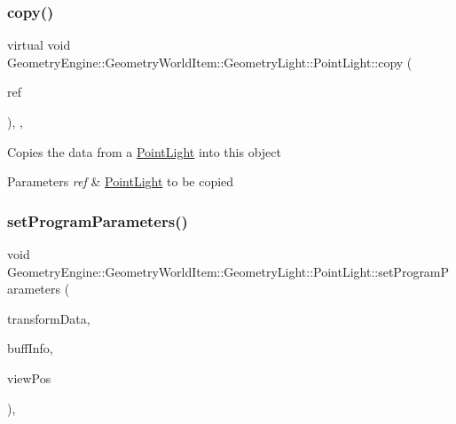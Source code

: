 \subsubsection{\texorpdfstring{copy()}{copy()}}
{\footnotesize\ttfamily virtual void Geometry\+Engine\+::\+Geometry\+World\+Item\+::\+Geometry\+Light\+::\+Point\+Light\+::copy (\begin{DoxyParamCaption}\item[{const \mbox{\hyperlink{class_geometry_engine_1_1_geometry_world_item_1_1_geometry_light_1_1_point_light}{Point\+Light}} \&}]{ref }\end{DoxyParamCaption})\hspace{0.3cm}{\ttfamily [inline]}, {\ttfamily [protected]}, {\ttfamily [virtual]}}

Copies the data from a \mbox{\hyperlink{class_geometry_engine_1_1_geometry_world_item_1_1_geometry_light_1_1_point_light}{Point\+Light}} into this object 
\begin{DoxyParams}{Parameters}
{\em ref} & \mbox{\hyperlink{class_geometry_engine_1_1_geometry_world_item_1_1_geometry_light_1_1_point_light}{Point\+Light}} to be copied \\
\hline
\end{DoxyParams}
\mbox{\label{class_geometry_engine_1_1_geometry_world_item_1_1_geometry_light_1_1_point_light_a287719ee9b9e395314212862105a83b4}} 
\subsubsection{\texorpdfstring{setProgramParameters()}{setProgramParameters()}}
{\footnotesize\ttfamily void Geometry\+Engine\+::\+Geometry\+World\+Item\+::\+Geometry\+Light\+::\+Point\+Light\+::set\+Program\+Parameters (\begin{DoxyParamCaption}\item[{const \mbox{\hyperlink{class_geometry_engine_1_1_lighting_transformation_data}{Lighting\+Transformation\+Data}} \&}]{transform\+Data,  }\item[{const \mbox{\hyperlink{class_geometry_engine_1_1_buffers_info}{Buffers\+Info}} \&}]{buff\+Info,  }\item[{const Q\+Vector3D \&}]{view\+Pos }\end{DoxyParamCaption})\hspace{0.3cm}{\ttfamily [protected]}, {\ttfamily [virtual]}}

